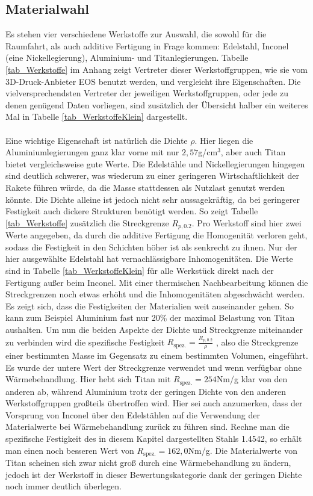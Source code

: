 \subsection{Materialwahl}
Es stehen vier verschiedene Werkstoffe zur Auswahl, die sowohl für die Raumfahrt, als auch additive Fertigung in Frage kommen: Edelstahl, Inconel (eine Nickellegierung), Aluminium- und Titanlegierungen. Tabelle \ref{tab_Werkstoffe} im Anhang zeigt Vertreter dieser Werkstoffgruppen, wie sie vom 3D-Druck-Anbieter EOS benutzt werden, und vergleicht ihre Eigenschaften. Die vielversprechendsten Vertreter der jeweiligen Werkstoffgruppen, oder jede zu denen genügend Daten vorliegen, sind zusätzlich der Übersicht halber ein weiteres Mal in Tabelle \ref{tab_WerkstoffeKlein} dargestellt.
\\~\\
Eine wichtige Eigenschaft ist natürlich die Dichte $\rho$. Hier liegen die Aluminiumlegierungen ganz klar vorne mit nur $2,57$g/cm$^3$, aber auch Titan bietet vergleichsweise gute Werte. Die Edelstähle und Nickellegierungen hingegen sind deutlich schwerer, was wiederum zu einer geringeren Wirtschaftlichkeit der Rakete führen würde, da die Masse stattdessen als Nutzlast genutzt werden könnte. Die Dichte alleine ist jedoch nicht sehr aussagekräftig, da bei geringerer Festigkeit auch dickere Strukturen benötigt werden. So zeigt Tabelle \ref{tab_Werkstoffe} zusätzlich die Streckgrenze $R_{p,0.2}$. Pro Werkstoff sind hier zwei Werte angegeben, da durch die additive Fertigung die Homogenität verloren geht, sodass die Festigkeit in den Schichten höher ist als senkrecht zu ihnen. Nur der hier ausgewählte Edelstahl hat vernachlässigbare Inhomogenitäten. Die Werte sind in Tabelle \ref{tab_WerkstoffeKlein} für alle Werkstück direkt nach der Fertigung außer beim Inconel. Mit einer thermischen Nachbearbeitung können die Streckgrenzen noch etwas erhöht und die Inhomogenitäten abgeschwächt werden. Es zeigt sich, dass die Festigkeiten der Materialien weit auseinander gehen. So kann zum Beispiel Aluminium fast nur 20\% der maximal Belastung von Titan aushalten. Um nun die beiden Aspekte der Dichte und Streckgrenze miteinander zu verbinden wird die spezifische Festigkeit $R_\mathrm{spez.}=\frac{R_{p,0.2}}{\rho}$ , also die Streckgrenze einer bestimmten Masse im Gegensatz zu einem bestimmten Volumen, eingeführt. Es wurde der untere Wert der Streckgrenze verwendet und wenn verfügbar ohne Wärmebehandlung. Hier hebt sich Titan mit $R_\mathrm{spez.}=254$Nm/g klar von den anderen ab, während Aluminium trotz der geringen Dichte von den anderen Werkstoffgruppen großteils übertroffen wird. Hier sei auch anzumerken, dass der Vorsprung von Inconel über den Edelstählen auf die Verwendung der Materialwerte bei Wärmebehandlung zurück zu führen sind. Rechne man die spezifische Festigkeit des in diesem Kapitel dargestellten Stahls 1.4542, so erhält man einen noch besseren Wert von $R_\mathrm{spez.} = 162,0$Nm/g. Die Materialwerte von Titan scheinen sich zwar nicht groß durch eine Wärmebehandlung zu ändern, jedoch ist der Werkstoff in dieser Bewertungskategorie dank der geringen Dichte noch immer deutlich überlegen.
